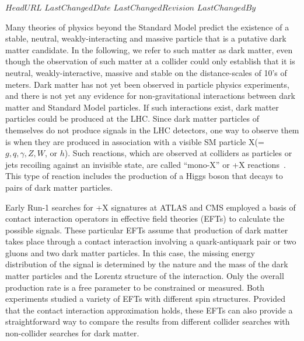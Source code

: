 \svnidlong
{$HeadURL$}
{$LastChangedDate$}
{$LastChangedRevision$}
{$LastChangedBy$}

Many theories of physics beyond the Standard Model predict the existence
of a stable, neutral, weakly-interacting and massive particle that is
a putative dark matter candidate.   In the following, we refer to such
matter as dark matter, even though the observation of such matter at a collider
could only establish that it is neutral, weakly-interactive, massive and stable
on the distance-scales of 10's of meters.
Dark matter has not yet been observed in particle physics experiments, and
there is not yet any evidence for non-gravitational interactions
between dark matter and Standard Model particles.  If such
interactions exist, dark matter particles could be produced
at the LHC. Since dark matter particles of themselves do not produce signals
in the LHC detectors, one way to observe them is when they are produced in association
with a visible SM particle X(=$g, q, \gamma, Z, W$, or $h$).
Such reactions, which are
observed at colliders as particles or jets recoiling against an invisible state, are
called ``mono-X'' or \MET{}+X reactions~\cite{Feng:2005gj,Beltran:2010ww,Bai:2010hh}.
This type of reaction includes the production of a Higgs boson that
decays to pairs of dark matter particles.

Early Run-1 searches for \MET{}+X signatures at ATLAS and CMS employed
a basis of contact interaction operators in 
effective field theories (EFTs) \cite{Goodman:2010yf,Goodman:2010ku} to
calculate the possible signals.
These particular EFTs assume that production of dark matter takes place through
a contact interaction involving a quark-antiquark pair or two gluons and
two dark matter particles.  In this case,
the missing
energy distribution of the signal is determined
by the nature and the mass of the dark
matter particles and the Lorentz structure of the interaction. Only the
overall production rate is a free parameter to be constrained or measured.
Both experiments studied a variety
of EFTs with different spin structures. Provided that the contact
interaction approximation holds, these EFTs can also provide a
straightforward way to compare the results from different collider
searches with non-collider searches for dark matter.  

